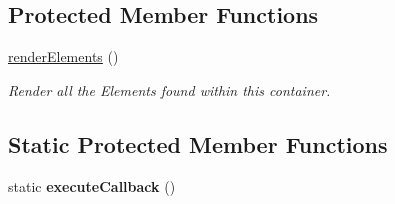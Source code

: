 \subsection*{Protected Member Functions}
\begin{DoxyCompactItemize}
\item 
\hyperlink{class_container_a53d81cac8dd6992b0d7a6c2662fc4b36}{renderElements} ()
\begin{DoxyCompactList}\small\item\em Render all the Elements found within this container. \item\end{DoxyCompactList}\end{DoxyCompactItemize}
\subsection*{Static Protected Member Functions}
\begin{DoxyCompactItemize}
\item 
\hypertarget{class_container_a995f51b990303cbe1cb41d67c287079d}{
static {\bfseries executeCallback} ()}
\label{class_container_a995f51b990303cbe1cb41d67c287079d}

\end{DoxyCompactItemize}
